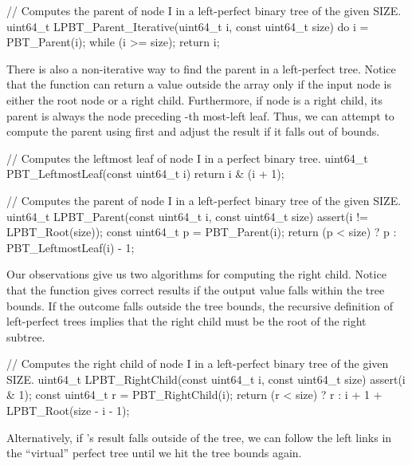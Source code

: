 \documentclass{article}
\begin{document}
\begin{code}[c]
// Computes the parent of node I in a left-perfect binary tree of the given SIZE.
uint64_t LPBT_Parent_Iterative(uint64_t i, const uint64_t size) {
    do { i = PBT_Parent(i); } while (i >= size);
    return i;
}
\end{code}

There is also a non-iterative way to find the parent in a left-perfect tree.
Notice that the  function can return a value outside the array only if the input node is either the root node or a right child.
Furthermore, if node  is a right child, its parent is always the node preceding -th most-left leaf.
Thus, we can attempt to compute the parent using  first and adjust the result if it falls out of bounds.

\begin{code}[c]
// Computes the leftmost leaf of node I in a perfect binary tree.
uint64_t PBT_LeftmostLeaf(const uint64_t i) {
    return i & (i + 1);
}

// Computes the parent of node I in a left-perfect binary tree of the given SIZE.
uint64_t LPBT_Parent(const uint64_t i, const uint64_t size) {
    assert(i != LPBT_Root(size));
    const uint64_t p = PBT_Parent(i);
    return (p < size) ? p : PBT_LeftmostLeaf(i) - 1;
}
\end{code}

Our observations give us two algorithms for computing the right child.
Notice that the  function gives correct results if the output value falls within the tree bounds.
If the outcome falls outside the tree bounds, the recursive definition of left-perfect trees implies that the right child must be the root of the right subtree.

\begin{code}[c]
// Computes the right child of node I in a left-perfect binary tree of the given SIZE.
uint64_t LPBT_RightChild(const uint64_t i, const uint64_t size) {
    assert(i & 1);
    const uint64_t r = PBT_RightChild(i);
    return (r < size) ? r : i + 1 + LPBT_Root(size - i - 1);
}
\end{code}

Alternatively, if 's result falls outside of the tree, we can follow the left links in the ``virtual'' perfect tree until we hit the tree bounds again.
\end{document}
